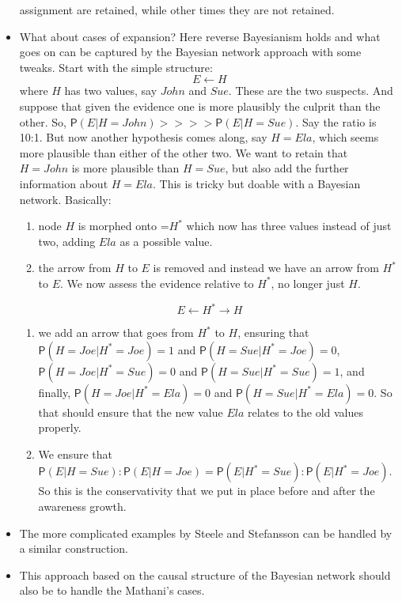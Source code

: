 \documentclass[
  11pt,
  dvipsnames,enabledeprecatedfontcommands]{scrartcl}
\newcommand{\pr}[1]{\ensuremath{\mathsf{P}(#1)}}
\begin{document}
\begin{itemize}
  assignment are retained, while other times they are not retained.
\item
  What about cases of expansion? Here reverse Bayesianism holds and what
  goes on can be captured by the Bayesian network approach with some
  tweaks. Start with the simple structure: \[E\leftarrow H\] where \(H\)
  has two values, say \(John\) and \(Sue\). These are the two suspects.
  And suppose that given the evidence one is more plausibly the culprit
  than the other. So, \(\pr{E \vert H=John}>>>>\pr{E \vert H=Sue}\). Say
  the ratio is 10:1. But now another hypothesis comes along, say
  \(H=Ela\), which seems more plausible than either of the other two. We
  want to retain that \(H=John\) is more plausible than \(H=Sue\), but
  also add the further information about \(H=Ela\). This is tricky but
  doable with a Bayesian network. Basically:

  \begin{enumerate}
  \def\labelenumi{(\alph{enumi})}
  \item
    node \(H\) is morphed onto =\(H^*\) which now has three values
    instead of just two, adding \(Ela\) as a possible value.
  \item
    the arrow from \(H\) to \(E\) is removed and instead we have an
    arrow from \(H^*\) to \(E\). We now assess the evidence relative to
    \(H^*\), no longer just \(H\).
  \end{enumerate}

  \[E\leftarrow H^* \rightarrow H\]

  \begin{enumerate}
  \def\labelenumi{(\alph{enumi})}
  \setcounter{enumi}{2}
  \item
    we add an arrow that goes from \(H^*\) to \(H\), ensuring that
    \(\pr{H=Joe \vert H^*=Joe}=1\) and \(\pr{H=Sue \vert H^*=Joe}=0\),
    \(\pr{H=Joe \vert H^*=Sue}=0\) and \(\pr{H=Sue \vert H^*=Sue}=1\),
    and finally, \(\pr{H=Joe \vert H^*=Ela}=0\) and
    \(\pr{H=Sue \vert H^*=Ela}=0\). So that should ensure that the new
    value \(Ela\) relates to the old values properly.
  \item
    We ensure that
    \(\pr{E \vert H=Sue}:\pr{E \vert H=Joe}=\pr{E \vert H^*=Sue}: \pr{E \vert H^*=Joe}\).
    So this is the conservativity that we put in place before and after
    the awareness growth.
  \end{enumerate}
\item
  The more complicated examples by Steele and Stefansson can be handled
  by a similar construction.
\item
  This approach based on the causal structure of the Bayesian network
  should also be to handle the Mathani's cases.
\end{itemize}
\end{document}

